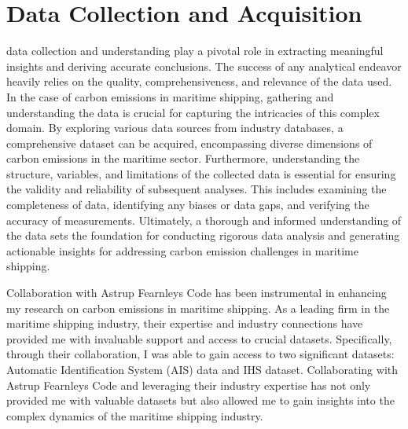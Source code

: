 \chapter{Data Collection and Acquisition}

data collection and understanding play a pivotal role in extracting meaningful insights and deriving accurate conclusions.
The success of any analytical endeavor heavily relies on the quality, comprehensiveness, and relevance of the data used.
In the case of carbon emissions in maritime shipping, gathering and understanding the data is crucial for capturing the intricacies of this complex domain.
By exploring various data sources from industry databases, a comprehensive dataset can be acquired, encompassing diverse dimensions of carbon emissions in the maritime sector.
Furthermore, understanding the structure, variables, and limitations of the collected data is essential for ensuring the validity and reliability of subsequent analyses.
This includes examining the completeness of data, identifying any biases or data gaps, and verifying the accuracy of measurements.
Ultimately, a thorough and informed understanding of the data sets the foundation for conducting rigorous data analysis and generating actionable insights for addressing carbon emission challenges in maritime shipping.

Collaboration with Astrup Fearnleys Code has been instrumental in enhancing my research on carbon emissions in maritime shipping.
As a leading firm in the maritime shipping industry, their expertise and industry connections have provided me with invaluable support and access to crucial datasets.
Specifically, through their collaboration, I was able to gain access to two significant datasets: Automatic Identification System (AIS) data and IHS dataset.
Collaborating with Astrup Fearnleys Code and leveraging their industry expertise has not only provided me with valuable datasets but also allowed me to gain insights into the complex dynamics of the maritime shipping industry.

\newpage



\newpage



